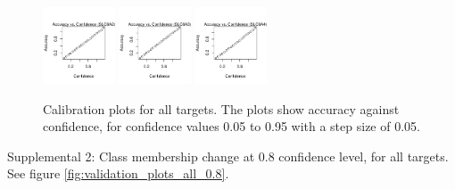 \documentclass[utf8]{frontiersSCNS} %
\begin{document}
\begin{figure}[h!]
\includegraphics[width=0.19\textwidth]{figures/calibration_plots/slc6a2_calib.pdf}
\includegraphics[width=0.19\textwidth]{figures/calibration_plots/slc6a3_calib.pdf}
\includegraphics[width=0.19\textwidth]{figures/calibration_plots/slc6a4_calib.pdf}

    \caption{Calibration plots for all targets. The plots show accuracy against
        confidence, for confidence values 0.05 to 0.95 with a step size of 0.05.}
    \label{fig:calibration_plots_all}
\end{figure}

Supplemental 2: Class membership change at 0.8 confidence level, for all
targets. See figure \ref{fig:validation_plots_all_0.8}.
\end{document}
